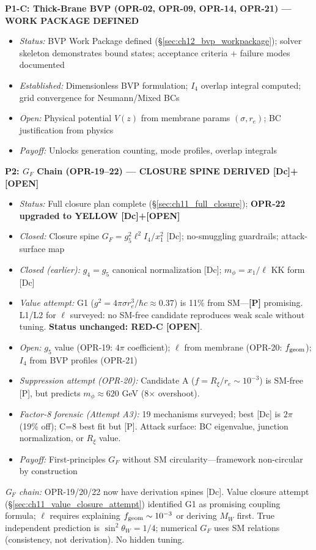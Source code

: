 \begin{tcolorbox}[colback=blue!5, colframe=blue!60!black,
    title=\textbf{OPR Closure Plan: Prioritized Research Program}]
\textbf{P1-C: Thick-Brane BVP (OPR-02, OPR-09, OPR-14, OPR-21) --- WORK PACKAGE DEFINED}
\begin{itemize}[nosep]
    \item \emph{Status:} BVP Work Package defined (\S\ref{sec:ch12_bvp_workpackage}); solver skeleton demonstrates bound states; acceptance criteria + failure modes documented
    \item \emph{Established:} Dimensionless BVP formulation; $I_4$ overlap integral computed; grid convergence for Neumann/Mixed BCs
    \item \emph{Open:} Physical potential $V(z)$ from membrane params $(\sigma, r_e)$; BC justification from physics
    \item \emph{Payoff:} Unlocks generation counting, mode profiles, overlap integrals
\end{itemize}

\textbf{P2: $G_F$ Chain (OPR-19--22) --- CLOSURE SPINE DERIVED [Dc]+[OPEN]}
\begin{itemize}[nosep]
    \item \emph{Status:} Full closure plan complete (\S\ref{sec:ch11_full_closure}); \textbf{OPR-22 upgraded to YELLOW [Dc]+[OPEN]}
    \item \emph{Closed:} Closure spine $G_F = g_5^2 \ell^2 I_4 / x_1^2$ [Dc]; no-smuggling guardrails; attack-surface map
    \item \emph{Closed (earlier):} $g_4 = g_5$ canonical normalization [Dc]; $m_\phi = x_1/\ell$ KK form [Dc]
    \item \emph{Value attempt:} G1 ($g^2 = 4\pi\sigma r_e^3/\hbar c \approx 0.37$) is 11\% from SM---\textbf{[P]} promising.
          L1/L2 for $\ell$ surveyed: no SM-free candidate reproduces weak scale without tuning. \textbf{Status unchanged: RED-C [OPEN]}.
    \item \emph{Open:} $g_5$ value (OPR-19: $4\pi$ coefficient); $\ell$ from membrane (OPR-20: $f_{\rm geom}$); $I_4$ from BVP profiles (OPR-21)
    \item \emph{Suppression attempt (OPR-20):} Candidate A ($f = R_\xi/r_e \sim 10^{-3}$) is SM-free [P], but predicts $m_\phi \approx 620$ GeV (8$\times$ overshoot).
    \item \emph{Factor-8 forensic (Attempt A3):} 19 mechanisms surveyed; best [Dc] is $2\pi$ (19\% off); C=8 best fit but [P]. Attack surface: BC eigenvalue, junction normalization, or $R_\xi$ value.
    \item \emph{Payoff:} First-principles $G_F$ without SM circularity---framework non-circular by construction
\end{itemize}
\noindent\emph{G$_F$ chain:} OPR-19/20/22 now have derivation spines [Dc]. Value closure attempt (\S\ref{sec:ch11_value_closure_attempt}) identified G1 as promising coupling formula; $\ell$ requires explaining $f_{\rm geom} \sim 10^{-3}$ or deriving $M_W$ first. True independent prediction is $\sin^2\theta_W = 1/4$; numerical $G_F$ uses SM relations (consistency, not derivation). No hidden tuning.


\end{tcolorbox}
